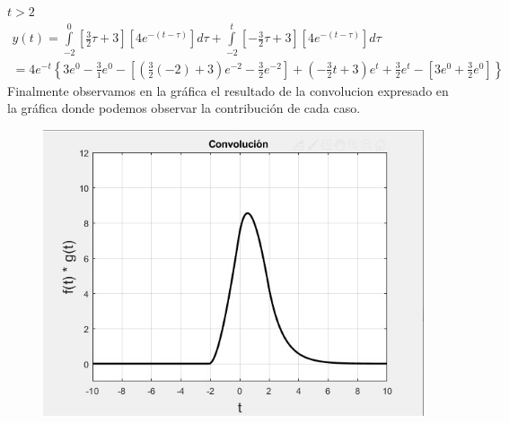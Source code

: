 \documentclass[11pt,letterpaper]{article}
\begin{document}
$t>2$
\begin{align}
y(t) = \overset{0}{\underset{-2}{\int }} \left[ \frac{3}{2} \tau + 3 \right] \left[ 4e^{-(t-\tau)} \right]d\tau + \overset{t}{\underset{-2}{\int }} \left[ - \frac{3}{2} \tau + 3 \right] \left[ 4e^{-(t-\tau)} \right]d\tau\\
=4 e^{-t} \left\lbrace 3 e^0 - \frac{3}{1} e^0 - \left[ \left( \frac{3}{2} (-2) +3 \right) e^{-2} - \frac{3}{2} e ^{-2} \right] + \left( - \frac{3}{2} t + 3 \right) e^t + \frac{3}{2}e^t - \left[ 3e^0 + \frac{3}{2} e^0 \right] \right\rbrace 
\end{align}
\newpage
Finalmente observamos en la gráfica el resultado de la convolucion expresado en la gráfica donde
podemos observar la contribución de cada caso.
\begin{figure} [H]
\includegraphics[scale=0.6]{figura 7}
\end{figure}
\end{document}
